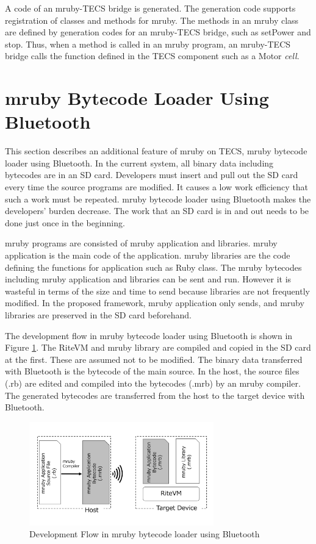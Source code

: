 \documentclass[conference,compsoc]{IEEEtran}
\begin{document}
A code of an mruby-TECS bridge is generated.
The generation code supports registration of classes and methods for mruby.
The methods in an mruby class are defined by generation codes for an mruby-TECS bridge, such as setPower and stop.
Thus, when a method is called in an mruby program, an mruby-TECS bridge calls the function defined in the TECS component such as a Motor {\it cell}.


 \section{mruby Bytecode Loader Using Bluetooth}
\label{sec:mruby bytecode loader using Bluetooth}
This section describes an additional feature of mruby on TECS, mruby bytecode loader using Bluetooth.
In the current system, all binary data including bytecodes are in an SD card.
Developers must insert and pull out the SD card every time the source programs are modified.
It causes a low work efficiency that such a work must be repeated.
mruby bytecode loader using Bluetooth makes the developers' burden decrease.
The work that an SD card is in and out needs to be done just once in the beginning.

mruby programs are consisted of mruby application and libraries.
mruby application is the main code of the application.
mruby libraries are the code defining the functions for application such as Ruby class. 
The mruby bytecodes including mruby application and libraries can be sent and run.
However it is wasteful in terms of the size and time to send because libraries are not frequently modified. 
In the proposed framework, mruby application only sends, and mruby libraries are preserved in the SD card beforehand.

The development flow in mruby bytecode loader using Bluetooth is shown in Figure \ref{fig:bluetooth_loader}.
The RiteVM and mruby library are compiled and copied in the SD card at the first.
These are assumed not to be modified.
The binary data transferred with Bluetooth is the bytecode of the main source.
In the host, the source files (.rb) are edited and compiled into the bytecodes (.mrb) by an mruby compiler.
The generated bytecodes are transferred from the host to the target device with Bluetooth.

\begin{figure}[t]
    \centering
    \includegraphics[width=8cm,clip]{figure/bluetooth_loader.pdf}
    \caption{Development Flow in mruby bytecode loader using Bluetooth}
    \label{fig:bluetooth_loader}
\end{figure}
\end{document}

